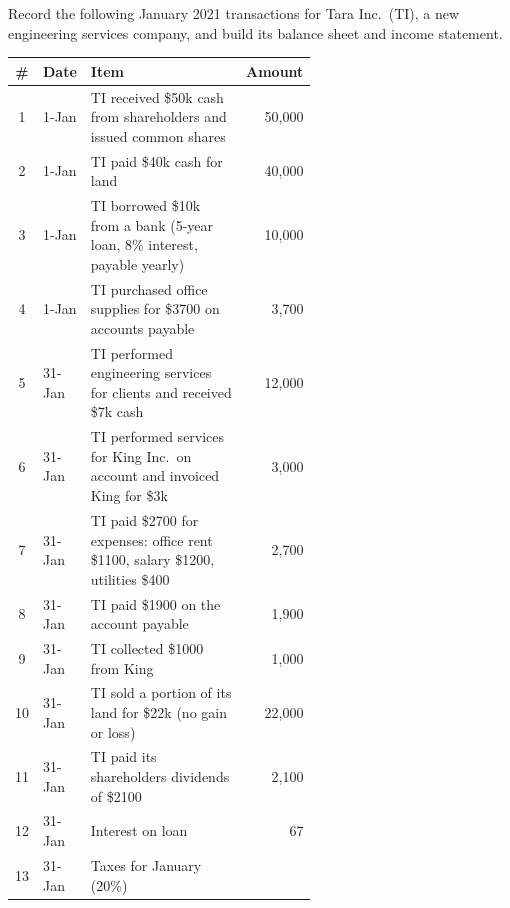 
\begin{example}
    Record the following January 2021 transactions for Tara Inc.\ (TI), a
    new engineering services company, and build its balance sheet and
    income statement.
    \begin{center}
    \small
    \begin{tabular}{clp{0.6\linewidth}r}
        \toprule
        \# & Date & Item & Amount \\
        \midrule
        1 & 1-Jan & TI received \$50k cash from shareholders and issued common shares & 50,000 \\
        2 & 1-Jan & TI paid \$40k cash for land & 40,000 \\
        3 & 1-Jan & TI borrowed \$10k from a bank (5-year loan, 8\% interest, payable yearly) & 10,000 \\
        4 & 1-Jan & TI purchased office supplies for \$3700 on accounts payable & 3,700 \\
        5 & 31-Jan & TI performed engineering services for clients and received \$7k cash & 12,000 \\
        6 & 31-Jan & TI performed services for King Inc.\ on account and invoiced King for \$3k & 3,000 \\
        7 & 31-Jan & TI paid \$2700 for expenses: office rent \$1100, salary \$1200, utilities \$400 & 2,700 \\
        8 & 31-Jan & TI paid \$1900 on the account payable & 1,900 \\
        9 & 31-Jan & TI collected \$1000 from King & 1,000 \\
        10 & 31-Jan & TI sold a portion of its land for \$22k (no gain or loss) & 22,000 \\
        11 & 31-Jan & TI paid its shareholders dividends of \$2100 & 2,100 \\
        12 & 31-Jan & Interest on loan & 67 \\
        13 & 31-Jan & Taxes for January (20\%) & \\
        \bottomrule
    \end{tabular}
    \end{center}
    \begin{center}
    \small
    \begin{tabular}{clrlr}

\end{tabular}
\end{center}
\end{example}
